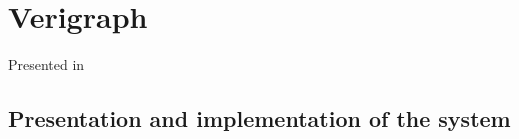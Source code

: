 \chapter{Verigraph}

Presented in~\cite{Bezerra2016,Costa2016}


\section{Presentation and implementation of the system}

